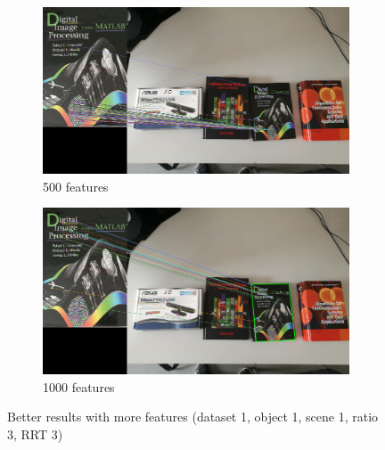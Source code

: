 \documentclass[a4paper]{article}
\begin{document}
\begin{figure}[h!]
    \begin{subfigure}[b]{0.45\textwidth}
        \includegraphics[width=\textwidth]{Data1_DetRANMatches_0_0_ratio3_RRT3_NF500.png}
        \caption{500 features}
        \label{fig:data100335}
    \end{subfigure}
    \quad
    \begin{subfigure}[b]{0.45\textwidth}
        \includegraphics[width=\textwidth]{Data1_DetRANMatches_0_0_ratio3_RRT3_NF1000.png}
        \caption{1000 features}
        \label{fig:data100331}
    \end{subfigure}
    \caption{Better results with more features (dataset 1, object 1, scene 1, ratio 3, RRT 3)}
    \label{fig:data1better}
\end{figure}
\end{document}

